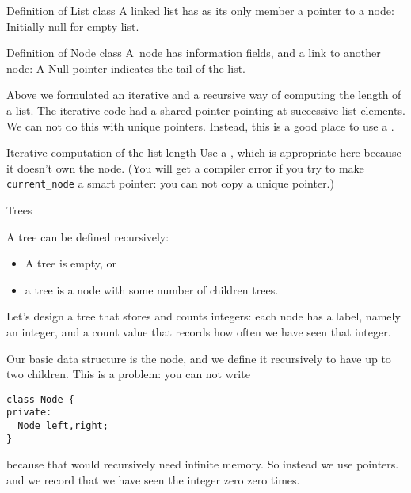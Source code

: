 \begin{block}{Definition of List class}
  \label{sl:list-class-u}
  A linked list has as its only member a pointer to a node:
  Initially null for empty list.
\end{block}

\begin{block}{Definition of Node class}
  \label{sl:node-class-u}
  A~node has information fields, and a
  link to another node:
  A Null pointer indicates the tail of the list.
\end{block}

Above we formulated an iterative and a recursive way of computing
the length of a list.
The iterative code had a shared pointer pointing at successive
list elements. We can not do this with unique pointers.
Instead, this is a good place to use a .

\begin{block}{Iterative computation of the list length}
  \label{sl:linkedlist-length-iter-u}
  Use a
  , which is appropriate here because it doesn't
  own the node.
  (You will get a compiler error if you try to make \lstinline{current_node} a
  smart pointer: you can not copy a unique pointer.)
\end{block}

 {Trees}
\prerequisite{\ref{ch:pointer}}

A tree can be defined recursively:
\begin{itemize}
\item A tree is empty, or
\item a tree is a node with some number of children trees.
\end{itemize}
Let's design a tree that stores and counts integers: each node has a
label, namely an integer, and a count value that records how often we
have seen that integer.

Our basic data structure is the node, and we define it recursively to
have up to two children. This is a problem: you can not write
\begin{lstlisting}
class Node {
private:
  Node left,right;
}
\end{lstlisting}
because that would recursively need infinite memory. So instead we use pointers.
%
%
and we record that we have seen the integer zero zero times.

